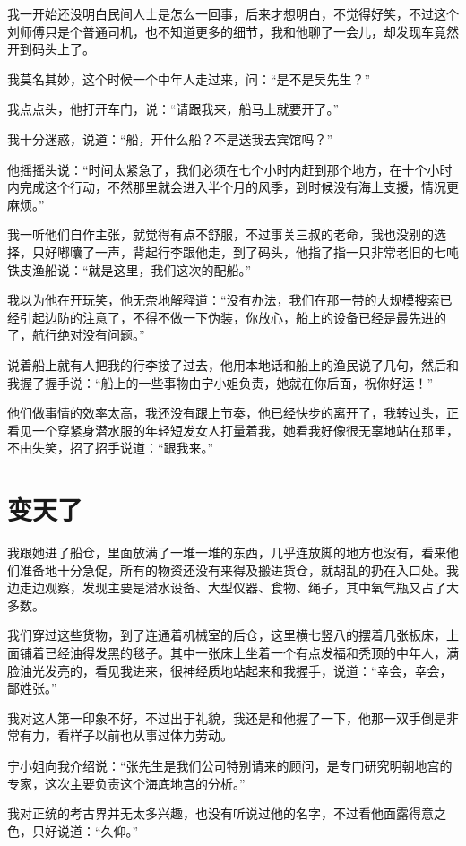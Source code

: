 我一开始还没明白民间人士是怎么一回事，后来才想明白，不觉得好笑，不过这个刘师傅只是个普通司机，也不知道更多的细节，我和他聊了一会儿，却发现车竟然开到码头上了。

我莫名其妙，这个时候一个中年人走过来，问：“是不是吴先生？”

我点点头，他打开车门，说：“请跟我来，船马上就要开了。”

我十分迷惑，说道：“船，开什么船？不是送我去宾馆吗？”

他摇摇头说：“时间太紧急了，我们必须在七个小时内赶到那个地方，在十个小时内完成这个行动，不然那里就会进入半个月的风季，到时候没有海上支援，情况更麻烦。”

我一听他们自作主张，就觉得有点不舒服，不过事关三叔的老命，我也没别的选择，只好嘟囔了一声，背起行李跟他走，到了码头，他指了指一只非常老旧的七吨铁皮渔船说：“就是这里，我们这次的配船。”

我以为他在开玩笑，他无奈地解释道：“没有办法，我们在那一带的大规模搜索已经引起边防的注意了，不得不做一下伪装，你放心，船上的设备已经是最先进的了，航行绝对没有问题。”

说着船上就有人把我的行李接了过去，他用本地话和船上的渔民说了几句，然后和我握了握手说：“船上的一些事物由宁小姐负责，她就在你后面，祝你好运！”

他们做事情的效率太高，我还没有跟上节奏，他已经快步的离开了，我转过头，正看见一个穿紧身潜水服的年轻短发女人打量着我，她看我好像很无辜地站在那里，不由失笑，招了招手说道：“跟我来。”

\chapter{变天了}

我跟她进了船仓，里面放满了一堆一堆的东西，几乎连放脚的地方也没有，看来他们准备地十分急促，所有的物资还没有来得及搬进货仓，就胡乱的扔在入口处。我边走边观察，发现主要是潜水设备、大型仪器、食物、绳子，其中氧气瓶又占了大多数。

我们穿过这些货物，到了连通着机械室的后仓，这里横七竖八的摆着几张板床，上面铺着已经油得发黑的毯子。其中一张床上坐着一个有点发福和秃顶的中年人，满脸油光发亮的，看见我进来，很神经质地站起来和我握手，说道：“幸会，幸会，鄙姓张。”

我对这人第一印象不好，不过出于礼貌，我还是和他握了一下，他那一双手倒是非常有力，看样子以前也从事过体力劳动。

宁小姐向我介绍说：“张先生是我们公司特别请来的顾问，是专门研究明朝地宫的专家，这次主要负责这个海底地宫的分析。”

我对正统的考古界并无太多兴趣，也没有听说过他的名字，不过看他面露得意之色，只好说道：“久仰。”

